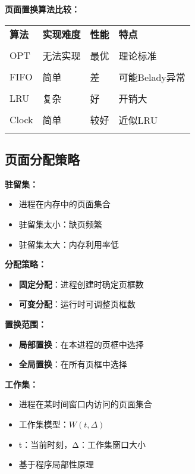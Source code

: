 \documentclass[lang=cn,newtx,10pt,scheme=chinese]{../../elegantbook}
\begin{document}
\textbf{页面置换算法比较：}
\begin{longtable}{@{}p{3cm}p{3cm}p{3cm}p{3cm}@{}}
\toprule
\textbf{算法} & \textbf{实现难度} & \textbf{性能} & \textbf{特点} \\\\ \midrule
\endhead

OPT & 无法实现 & 最优 & 理论标准 \\\\
FIFO & 简单 & 差 & 可能Belady异常 \\\\
LRU & 复杂 & 好 & 开销大 \\\\
Clock & 简单 & 较好 & 近似LRU \\\\

\bottomrule
\end{longtable}

\subsection{页面分配策略}

\textbf{驻留集：}
\begin{itemize}
  \item 进程在内存中的页面集合
  \item 驻留集太小：缺页频繁
  \item 驻留集太大：内存利用率低
\end{itemize}

\textbf{分配策略：}
\begin{itemize}
  \item \textbf{固定分配}：进程创建时确定页框数
  \item \textbf{可变分配}：运行时可调整页框数
\end{itemize}

\textbf{置换范围：}
\begin{itemize}
  \item \textbf{局部置换}：在本进程的页框中选择
  \item \textbf{全局置换}：在所有页框中选择
\end{itemize}

\textbf{工作集：}
\begin{itemize}
  \item 进程在某时间窗口内访问的页面集合
  \item 工作集模型：$W(t,Δ)$
  \item t：当前时刻，Δ：工作集窗口大小
  \item 基于程序局部性原理
\end{itemize}
\end{document}

